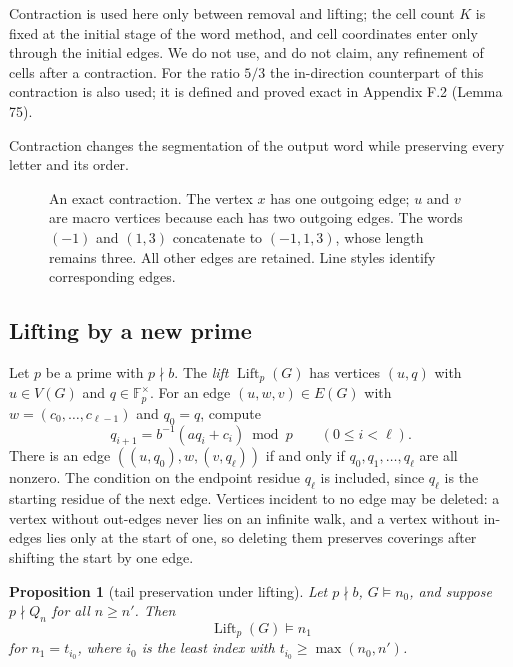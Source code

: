 \documentclass[11pt,reqno]{amsart}
\newtheorem{proposition}[theorem]{Proposition}
\theoremstyle{definition}
\theoremstyle{remark}
\begin{document}
Contraction is used here only between removal and lifting; the cell count
\(K\) is fixed at the initial stage of the word method, and cell
coordinates enter only through the initial edges. We do not use, and do
not claim, any refinement of cells after a contraction. For the ratio
\(5/3\) the in-direction counterpart of this contraction is also used;
it is defined and proved exact in Appendix F.2 (Lemma 75).

Contraction changes the segmentation of the output word while preserving every letter and its order.

\begin{figure}[htbp]
\centering

\caption{An exact contraction. The vertex \(x\) has one outgoing edge; \(u\) and \(v\) are macro vertices because each has two outgoing edges. The words \((-1)\) and \((1,3)\) concatenate to \((-1,1,3)\), whose length remains three. All other edges are retained. Line styles identify corresponding edges.}
\label{fig:word-contraction}
\end{figure}

\subsection{Lifting by a new prime}\label{sec:4.4}

Let \(p\) be a prime with \(p\nmid b\). The \emph{lift} \(\operatorname{Lift}_p(G)\)
has vertices \((u,q)\) with \(u\in V(G)\) and \(q\in\mathbb F_p^\times\).
For an edge \((u,w,v)\in E(G)\) with \(w=(c_0,\ldots,c_{\ell-1})\) and
\(q_0=q\), compute
\[
q_{i+1}=b^{-1}(aq_i+c_i)\bmod p\qquad(0\le i<\ell).
\]
There is an edge \(((u,q_0),w,(v,q_\ell))\) if and only if
\(q_0,q_1,\ldots,q_\ell\) are all nonzero. The condition on the endpoint
residue \(q_\ell\) is included, since \(q_\ell\) is the starting residue
of the next edge. Vertices incident to no edge may be deleted: a vertex
without out-edges never lies on an infinite walk, and a vertex without
in-edges lies only at the start of one, so deleting them preserves
coverings after shifting the start by one edge.

\begin{samepage}
\begin{proposition}[tail preservation under lifting]\leavevmode\label{thm:17}
Let \(p\nmid b\),
\(G\models n_0\), and suppose \(p\nmid Q_n\) for all \(n\ge n'\). Then
\[
\operatorname{Lift}_p(G)\models n_1
\]
for \(n_1=t_{i_0}\), where
\(i_0\) is the least index with \(t_{i_0}\ge\max(n_0,n')\).
\label{thm-end:17}
\end{proposition}
\end{samepage}
\end{document}
